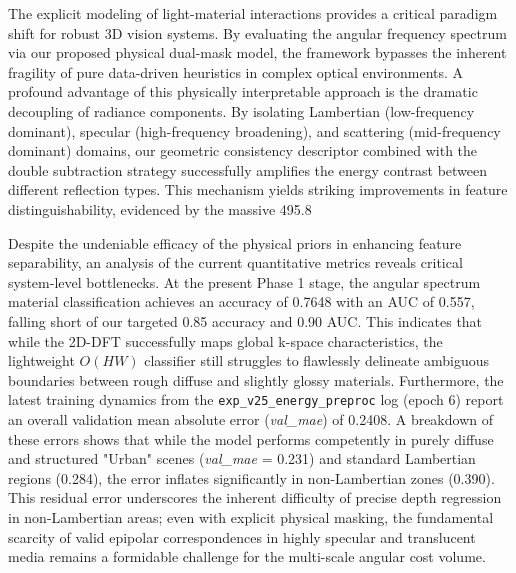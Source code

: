 \documentclass[lettersize,journal]{IEEEtran}
\begin{document}
The explicit modeling of light-material interactions provides a critical paradigm shift for robust 3D vision systems. By evaluating the angular frequency spectrum via our proposed physical dual-mask model, the framework bypasses the inherent fragility of pure data-driven heuristics in complex optical environments. A profound advantage of this physically interpretable approach is the dramatic decoupling of radiance components. By isolating Lambertian (low-frequency dominant), specular (high-frequency broadening), and scattering (mid-frequency dominant) domains, our geometric consistency descriptor combined with the double subtraction strategy successfully amplifies the energy contrast between different reflection types. This mechanism yields striking improvements in feature distinguishability, evidenced by the massive 495.8%

Despite the undeniable efficacy of the physical priors in enhancing feature separability, an analysis of the current quantitative metrics reveals critical system-level bottlenecks. At the present Phase 1 stage, the angular spectrum material classification achieves an accuracy of 0.7648 with an AUC of 0.557, falling short of our targeted 0.85 accuracy and 0.90 AUC. This indicates that while the 2D-DFT successfully maps global k-space characteristics, the lightweight $O(HW)$ classifier still struggles to flawlessly delineate ambiguous boundaries between rough diffuse and slightly glossy materials. Furthermore, the latest training dynamics from the \texttt{exp\_v25\_energy\_preproc} log (epoch 6) report an overall validation mean absolute error (\textit{val\_mae}) of 0.2408. A breakdown of these errors shows that while the model performs competently in purely diffuse and structured "Urban" scenes (\textit{val\_mae} = 0.231) and standard Lambertian regions (0.284), the error inflates significantly in non-Lambertian zones (0.390). This residual error underscores the inherent difficulty of precise depth regression in non-Lambertian areas; even with explicit physical masking, the fundamental scarcity of valid epipolar correspondences in highly specular and translucent media remains a formidable challenge for the multi-scale angular cost volume.
\end{document}
